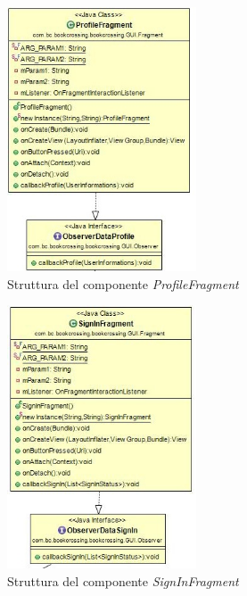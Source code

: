\begin{figure}[h!]
	\includegraphics[width=0.5\textwidth]{Immagini/ProfileFragment}
	\caption{Struttura del componente \textit{ProfileFragment}}
	\label{fig:ProfileFragment}
\end{figure}

\begin{figure}[h!]
	\includegraphics[width=0.5\textwidth]{Immagini/SignInFragment}
	\caption{Struttura del componente \textit{SignInFragment}}
	\label{fig:SignInFragment}
\end{figure}

